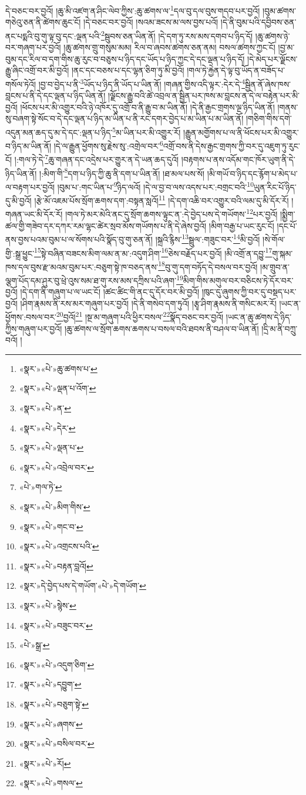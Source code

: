 དེ་བཅང་བར་བྱའོ། །ཆུ་མི་འཛག་ན་ཤིང་ལེབ་ཀྱིས་:ཆུ་ཚགས་ལ་\footnote{«སྣར་»«པེ་»ཆུ་ཚགས་པ་}དལ་བུ་དལ་བུས་གདབ་པར་བྱའོ། །བུམ་ཚགས་གཅེའུ་ཅན་ནི་ཚེགས་ཆུང་ངོ། །དེ་བཅང་བར་བྱའོ། །སའམ་ཟངས་མ་ལས་བྱས་པའོ། །དེ་ནི་བུམ་པའི་དབྱིབས་ཅན་ནང་པདྨའི་བུ་གུ་ལྟ་བུ་དང་:ལྡན་པའི་\footnote{«སྣར་»«པེ་»ལྡན་པ་འོག་}སྦུབས་ཅན་ཡིན་ནོ། །དེ་དག་ཏུ་རས་མས་དགབ་པ་ཉིད་དོ། །ཆུ་ཚགས་ཉེ་བར་གཞག་པར་བྱའོ། །ཆུ་ཚགས་གྲུ་གསུམ་མམ། རིལ་བ་ཞབས་ཚགས་ཅན་ནམ། བསལ་ཚགས་ཀྱང་ངོ། །བྱ་མ་བུམ་དང་རིལ་བ་དག་གིས་ཆུ་རུང་བ་བཅུས་པ་ཉིད་དང་ཡོད་པ་ཉིད་ཀྱང་དེ་དང་ལྡན་པ་ཉིད་དོ། །དེ་མེད་པར་ལྗོངས་རྒྱུ་ཞིང་འགྲོ་བར་མི་བྱའོ། །ནང་དང་བཅས་པ་དང་ལྷན་ཅིག་ཏུ་མི་བྱའོ། །གལ་ཏེ་རྐྱེན་དེ་ལྟ་བུ་ཡོད་ན་བཟོད་པ་གསོལ་ཏེའོ། །བྱ་བ་བྱེད་པ་ནི་\footnote{«སྣར་»«པེ་»ན་}ཡོད་པ་ཉིད་ནི་ཡོད་པ་ཡིན་ནོ། །གཞན་གྱིས་འདི་ལྟར་:དེར་དེ་\footnote{«སྣར་»«པེ་»དེར་}སྦྱིན་ནོ་ཞེས་ཁས་བླངས་པ་ནི་དེ་དང་ལྡན་པ་ཉིད་ཡིན་ནོ། །ལྗོངས་རྒྱུ་བའི་ཚེ་འབྲལ་ན་སྦྱིན་པར་ཁས་མ་བླངས་ན་དེ་ལ་བརྟེན་པར་མི་བྱའོ། །ཕོངས་པར་མི་འགྱུར་བའི་ཉེ་འཁོར་དུ་འགྲོ་བ་ནི་རྒྱུ་བ་མ་ཡིན་ནོ། །དེ་ནི་རྒྱང་གྲགས་ལྔ་ཉིད་ཡིན་ནོ། །གནས་སུ་བཞག་སྟེ་སོང་བ་དེ་དང་ལྡན་པ་ཉིད་མ་ཡིན་པ་ནི་རང་དགར་བྱེད་པ་མ་ཡིན་པ་མ་ཡིན་ནོ། །གཅིག་གིས་དགེ་འདུན་མན་ཆད་དུ་མ་དེ་དང་:ལྡན་པ་ཉིད་\footnote{«སྣར་»«པེ་»ལྡན་པ་}མ་ཡིན་པར་མི་འགྱུར་རོ། །རྒྱུན་མགྱོགས་པ་ལ་ནི་ཕོངས་པར་མི་འགྱུར་བ་ཉིད་མ་ཡིན་ནོ། །དེ་ལ་རྒྱུན་ཕྱོགས་སུ་རྗེས་སུ་:འགྲེལ་བར་\footnote{«སྣར་»«པེ་»འབྲེལ་བར་}འགྲོ་བས་ནི་དེས་རྒྱང་གྲགས་ཀྱི་བར་དུ་འཇུག་ཏུ་རུང་ངོ། །:གལ་ཏེ་དེ་\footnote{«པེ་»གལ་ཏེ་}ཆུ་གཞན་དང་འདྲེས་པར་གྱུར་ན་དེ་ཡན་ཆད་དུའོ། །བརྟགས་པ་ནས་འདོམ་གང་ཁོར་ཡུག་ནི་དེ་ཉིད་ཡིན་ནོ། །:མིག་གི་\footnote{«སྣར་»«པེ་»མིག་གིས་}དག་པ་ཉིད་ཀྱི་ཆུ་ནི་དག་པ་ཡིན་ནོ། །ཐ་མལ་པས་སོ། །མི་གཡོ་བ་ཉིད་དང་རྙོག་པ་མེད་པ་ལ་བརྟག་པར་བྱའོ། །བུམ་པ་:གང་ཡིན་པ་\footnote{«སྣར་»«པེ་»གང་བ་}ཉིད་ལའོ། །དེ་ལ་བྱ་བ་ལས་འདས་པར་:བགྲང་བའི་\footnote{«སྣར་»«པེ་»འགྲངས་པའི་}ཡུན་རིང་པོ་ཉིད་དུ་མི་བྱའོ། །རྩེ་མོ་འཇམ་པོས་སྲོག་ཆགས་དག་:བསྟན་སླའོ།\footnote{«སྣར་»«པེ་»བརྟན་བླའོ།} །དེ་དག་འཆི་བར་འགྱུར་བའི་ལམ་དུ་མི་དོར་རོ། །གཞན་ཡང་མི་དོར་རོ། །གལ་ཏེ་མར་མེའི་ནང་དུ་སྲོག་ཆགས་ལྟུང་ན་:དེ་བྱེད་པས་དེ་གཡོགས་\footnote{«སྣར་»དེ་བྱེད་པས་དེ་གཡོག་«པེ་»དེ་གཡོག་}པར་བྱའོ། །སྨྱིག་ཚལ་གྱི་གཟེབ་དར་དཀར་རམ་ལྷང་ཚེར་སྲབ་མོས་གཡོགས་པ་ནི་དེ་ཞེས་བྱའོ། །མིག་བརྒྱ་པ་ཡང་རུང་ངོ། །དང་པོ་ནས་བྱས་པའམ་བུམ་པ་ལ་སོགས་པའི་སྣོད་བུ་གུ་ཅན་ནོ། །སྐྲའི་རྙིས་\footnote{«སྣར་»«པེ་»སྙེས་}སྦྲུལ་:གཟུང་བར་\footnote{«སྣར་»«པེ་»བཟུང་བར་}མི་བྱའོ། །སེ་གོལ་གྱི་:སྒྲ་ཕྱུང་\footnote{«པེ་»སྒྲ་}སྟེ་བཞིན་བཟངས་མིག་ལམ་ན་མ་:འདུག་ཤིག་\footnote{«སྣར་»«པེ་»འདུག་ཅིག་}ཅེས་བརྗོད་པར་བྱའོ། །མི་འགྲོ་ན་དབྱུ་\footnote{«སྣར་»«པེ་»དབྱུག་}གུ་སྐམ་ཁས་དལ་བུས་རྫ་མའམ་བུམ་པར་:བཅུག་སྟེ་ཁ་བཅད་ནས་\footnote{«སྣར་»«པེ་»བཅུག་སྟེ་}བུ་གུ་དག་བཏོད་དེ་བསལ་བར་བྱའོ། །མ་གྲུབ་ན་ལྕག་པོད་དམ་ཤུར་བུ་ཕྲེ་འུས་སམ་ཐ་གུ་རས་མས་དཀྲིས་པའི་ཞག་\footnote{«སྣར་»«པེ་»ཞགས་}མིག་གིས་མགུལ་བར་བཅིངས་ཏེ་དོར་བར་བྱའོ། །དེ་དག་ནི་གཞུག་པ་ལ་ཡང་ངོ། །ཚང་ཚིང་གི་ནང་དུ་དོར་བར་མི་བྱའོ། །ཁུང་དུ་ཞུགས་ཀྱི་བར་དུ་བསྡད་པར་བྱའོ། །ཤིག་རྣམས་ནི་རས་མར་གཞུག་པར་བྱའོ། །དེ་ནི་གསེབ་དག་ཏུའོ། །རྩྭ་ཤིག་རྣམས་ནི་གསིང་མར་རོ། །ཡང་ན་ཕྱོགས་:བསལ་བར་\footnote{«སྣར་»«པེ་»བསིལ་བར་}བྱའོ།\footnote{«སྣར་»«པེ་»རོ།} །སྔ་མ་གཞུག་པའི་ཕྱིར་བསལ་\footnote{«སྣར་»«པེ་»གསལ་}སྣོད་བཅང་བར་བྱའོ། །ཡང་ན་ཆུ་ཚགས་དེ་ཉིད་ཀྱིས་གཞུག་པར་བྱའོ། །ཆུ་ཚགས་ལ་སྲོག་ཆགས་ཆགས་པ་བསལ་བའི་ཐབས་ནི་བཤལ་བ་ཡིན་ནོ། །དྲི་མ་ནི་བཀྲུ་བའོ། །
